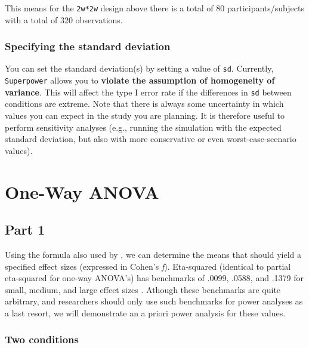 \documentclass[]{book}
\begin{document}
This means for the \texttt{2w*2w} design above there is a total of 80 participants/subjects with a total of 320 observations.

\hypertarget{specifying-the-standard-deviation}{%
\subsection{Specifying the standard deviation}\label{specifying-the-standard-deviation}}

You can set the standard deviation(s) by setting a value of \texttt{sd}. Currently, \texttt{Superpower} allows you to \textbf{violate the assumption of homogeneity of variance}. This will affect the type I error rate if the differences in \texttt{sd} between conditions are extreme. Note that there is always some uncertainty in which values you can expect in the study you are planning. It is therefore useful to perform sensitivity analyses (e.g., running the simulation with the expected standard deviation, but also with more conservative or even worst-case-scenario values).

\hypertarget{one-way-anova}{%
\chapter{One-Way ANOVA}\label{one-way-anova}}

\hypertarget{part-1}{%
\section{Part 1}\label{part-1}}

Using the formula also used by \citet{albers2018power}, we can determine the means that should yield a specified effect sizes (expressed in Cohen's \emph{f}). Eta-squared (identical to partial eta-squared for one-way ANOVA's) has benchmarks of .0099, .0588, and .1379 for small, medium, and large effect sizes \citep{cohen1988spa}. Athough these benchmarks are quite arbitrary, and researchers should only use such benchmarks for power analyses as a last resort, we will demonstrate an a priori power analysis for these values.

\hypertarget{two-conditions}{%
\subsection{Two conditions}\label{two-conditions}}
\end{document}
